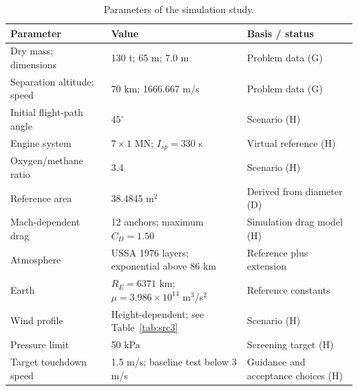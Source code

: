 \begin{table}[htbp]
\caption{Parameters of the simulation study.}
\label{tab:src4}
\small
\setlength{\tabcolsep}{3.5pt}
\begin{tabularx}{\linewidth}{@{}p{.26\linewidth}p{.36\linewidth}X@{}}
\toprule
Parameter & Value & Basis / status \\
\midrule
Dry mass; dimensions & 130 t; 65 m; 7.0 m & Problem data (G) \\
Separation altitude; speed & 70 km; 1666.667 m/s & Problem data (G) \\
Initial flight-path angle & $45^\circ$ & Scenario (H) \\
Engine system & $7\times1$ MN; $I_{sp}=330$ s & Virtual reference (H) \\
Oxygen/methane ratio & 3.4 & Scenario (H) \\
Reference area & 38.4845 m$^2$ & Derived from diameter (D) \\
Mach-dependent drag & 12 anchors; maximum $C_D=1.50$ & Simulation drag model (H) \\
Atmosphere & USSA 1976 layers; exponential above 86 km & Reference plus extension \\
Earth & $R_E=6371$ km; $\mu=3.986\times10^{14}$ m$^3$/s$^2$ & Reference constants \\
Wind profile & Height-dependent; see Table~\ref{tab:src3} & Scenario (H) \\
Pressure limit & 50 kPa & Screening target (H) \\
Target touchdown speed & 1.5 m/s; baseline test below 3 m/s & Guidance and acceptance choices (H) \\
\bottomrule
\end{tabularx}
\par{}
\end{table}
